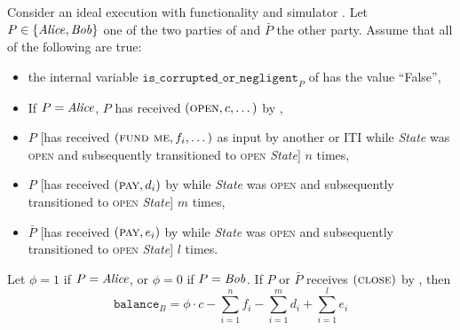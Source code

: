 \begin{lemma}
\label{lemma:ideal-balance}
  Consider an ideal execution with functionality \fchan and simulator
  \simulator.
  Let $P \in \{\mathit{Alice}, \mathit{Bob}\}$ one of the two parties of \fchan and $\bar{P}$
  the other party. Assume that all of the following are true:
  \begin{itemize}
    \item the internal variable $\texttt{is\_corrupted\_or\_negligent}_P$ of
    \fchan has the value ``False'',
    \item If $P = \mathit{Alice}$, $P$ has received $(\textsc{open}, c, \dots)$ by
    \environment,
    \item $P$ [has received $(\textsc{fund me}, f_i, \dots)$ as input by another
    \fchan or \pchan ITI while \textit{State} was \textsc{open} and subsequently
    \fchan transitioned to \textsc{open} \textit{State}] $n$ times,
    \item $P$ [has received $(\textsc{pay}, d_i)$ by \environment while
    \textit{State} was \textsc{open} and \fchan subsequently transitioned to
    \textsc{open} \textit{State}] $m$ times,
    \item $\bar{P}$ [has received $(\textsc{pay}, e_i)$ by \environment while
    \textit{State} was \textsc{open} and \fchan subsequently transitioned to
    \textsc{open} \textit{State}] $l$ times.
  \end{itemize}
  Let $\phi = 1$ if $P = \mathit{Alice}$, or $\phi = 0$ if $P = \mathit{Bob}$. If $P$ or
  $\bar{P}$ receives $(\textsc{close})$ by \simulator, then
  \begin{equation}
    \texttt{balance}_B = \phi \cdot c - \sum\limits_{i=1}^n f_i -
    \sum\limits_{i=1}^m d_i + \sum\limits_{i=1}^l e_i
  \end{equation}
\end{lemma}
